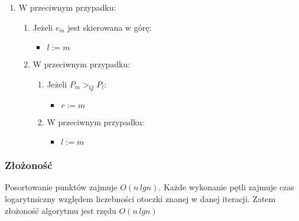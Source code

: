 \documentclass[11pt]{article}
\theoremstyle{remark} \newtheorem{definition}{def.}
\theoremstyle{definition} \newtheorem{twierdzenie}{tw.}
\begin{document}
\begin{enumerate}
\begin{enumerate}
\begin{enumerate}
\begin{enumerate}
\begin{itemize}
                                                    \end{itemize}
                                        \end{enumerate}
                            \end{enumerate}
                    \item   W przeciwnym przypadku:
                            \begin{enumerate}
                                \item   Jeżeli $e_m$ jest skierowana w górę:
                                        \begin{itemize}
                                            \item $l := m$
                                        \end{itemize}
                                \item   W przeciwnym przypadku: 
                                        \begin{enumerate}
                                            \item   Jeżeli $P_m >_Q P_l$:
                                                    \begin{itemize}
                                                        \item $r := m$
                                                    \end{itemize}
                                            \item   W przeciwnym przypadku:
                                                    \begin{itemize}
                                                        \item $l := m$
                                                    \end{itemize}
                                        \end{enumerate}
                            \end{enumerate}
                    \end{enumerate}
        \end{enumerate}


    \subsubsection{Złożoność}
        Posortowanie punktów zajmuje $O(n \, lgn)$. Każde wykonanie pętli zajmuje czas logarytmiczny względem liczebności otoczki
        znanej w danej iteracji. Zatem złożoność algorytmu jest rzędu $O(n \, lgn)$\\
\end{document}
